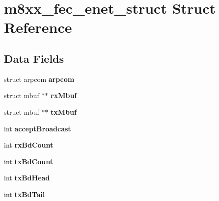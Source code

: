 \hypertarget{structm8xx__fec__enet__struct}{}\section{m8xx\+\_\+fec\+\_\+enet\+\_\+struct Struct Reference}
\label{structm8xx__fec__enet__struct}
\subsection*{Data Fields}
\begin{DoxyCompactItemize}
\item 
\mbox{\label{structm8xx__fec__enet__struct_a65f83479568fabf00d201e51cc6f6dbd}} 
struct arpcom {\bfseries arpcom}
\item 
\mbox{\label{structm8xx__fec__enet__struct_a0e1029e347e509024795990ef40acbd9}} 
struct mbuf $\ast$$\ast$ {\bfseries rx\+Mbuf}
\item 
\mbox{\label{structm8xx__fec__enet__struct_a542e04689149f39c43d48e9a3145a300}} 
struct mbuf $\ast$$\ast$ {\bfseries tx\+Mbuf}
\item 
\mbox{\label{structm8xx__fec__enet__struct_a9dd7e58357f05b98b80fbab294225078}} 
int {\bfseries accept\+Broadcast}
\item 
\mbox{\label{structm8xx__fec__enet__struct_a5de367dc4b92400ac5afdd75c8442a02}} 
int {\bfseries rx\+Bd\+Count}
\item 
\mbox{\label{structm8xx__fec__enet__struct_aeaec45b746864af09c8c31753d92170a}} 
int {\bfseries tx\+Bd\+Count}
\item 
\mbox{\label{structm8xx__fec__enet__struct_af92e693412cda48f975fefb0559b2695}} 
int {\bfseries tx\+Bd\+Head}
\item 
\mbox{\label{structm8xx__fec__enet__struct_a0f43039bd1edb8d734f9444052798bd5}} 
int {\bfseries tx\+Bd\+Tail}
\item 
\mbox{\label{structm8xx__fec__enet__struct_a8d17e0d78df594fc8892fcefe4071c28}} 

\end{DoxyCompactItemize}
